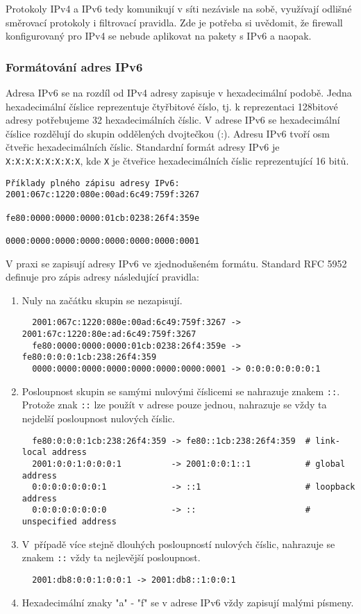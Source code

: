 Protokoly IPv4 a IPv6 tedy komunikují v síti nezávisle na sobě, využívají odlišné směrovací protokoly i filtrovací pravidla. Zde je potřeba si uvědomit, že firewall konfigurovaný pro IPv4 se nebude aplikovat na pakety s IPv6 a naopak. 

\subsubsection{Formátování adres IPv6}
Adresa IPv6 se na rozdíl od IPv4 adresy zapisuje v hexadecimální podobě. Jedna hexadecimální číslice reprezentuje čtyřbitové číslo, tj. k reprezentaci 128bitové adresy potřebujeme 32 hexadecimálních číslic. V adrese IPv6 se hexadecimální číslice rozdělují do skupin oddělených dvojtečkou (:). Adresu IPv6 tvoří osm čtveřic hexadecimálních číslic. Standardní formát adresy IPv6 je {\tt X:X:X:X:X:X:X:X}, kde {\tt X} je čtveřice hexadecimálních číslic reprezentující 16 bitů. 
\begin{verbatim}
Příklady plného zápisu adresy IPv6: 2001:067c:1220:080e:00ad:6c49:759f:3267
                                    fe80:0000:0000:0000:01cb:0238:26f4:359e
                                    0000:0000:0000:0000:0000:0000:0000:0001
\end{verbatim}
V praxi se zapisují adresy IPv6 ve zjednodušeném formátu. Standard RFC 5952 \cite{rfc5952} definuje pro zápis adresy následující pravidla:
\begin{enumerate}
  \item Nuly na začátku skupin se nezapisují. 
\begin{verbatim}
  2001:067c:1220:080e:00ad:6c49:759f:3267 -> 2001:67c:1220:80e:ad:6c49:759f:3267
  fe80:0000:0000:0000:01cb:0238:26f4:359e -> fe80:0:0:0:1cb:238:26f4:359
  0000:0000:0000:0000:0000:0000:0000:0001 -> 0:0:0:0:0:0:0:1
\end{verbatim}
\item Posloupnost skupin se samými nulovými číslicemi se nahrazuje znakem {\tt ::}. Protože znak {\tt ::} lze použít v adrese pouze jednou, nahrazuje se vždy ta nejdelší posloupnost nulových číslic.  
\begin{verbatim}
  fe80:0:0:0:1cb:238:26f4:359 -> fe80::1cb:238:26f4:359  # link-local address
  2001:0:0:1:0:0:0:1          -> 2001:0:0:1::1           # global address
  0:0:0:0:0:0:0:1             -> ::1                     # loopback address   
  0:0:0:0:0:0:0:0             -> ::                      # unspecified address 
\end{verbatim}
  \item V~případě více stejně dlouhých posloupností nulových číslic, nahrazuje se znakem {\tt ::} vždy ta nejlevější posloupnost.
\begin{verbatim}
  2001:db8:0:0:1:0:0:1 -> 2001:db8::1:0:0:1
\end{verbatim}
    \item Hexadecimální znaky "a" - "f" se v adrese IPv6 vždy zapisují malými písmeny.
\end{enumerate}

